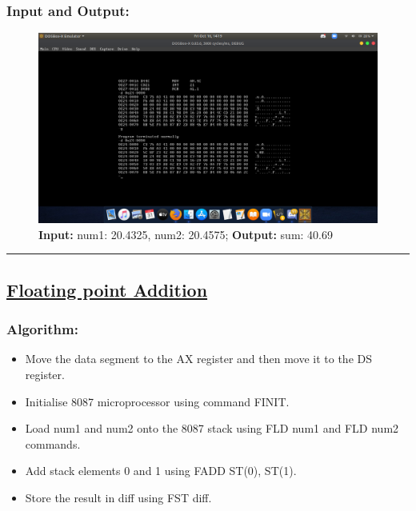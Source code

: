 \documentclass[10pt,a4paper]{article}
\begin{document}
\begin{flushleft}
\subsubsection*{\textbf{Input and Output:}}
\begin{figure}[h]
    \centering
    \includegraphics[trim = 100mm 60mm 100mm 80mm, clip, width = \textwidth]{Pics/FAIO.png}
    \caption{ \textbf{Input:} num1: 20.4325, num2: 20.4575; \newline \hspace{1cm}
              \textbf{Output:} sum: 40.69}
\end{figure}
\hrule
\newpage
\subsection*{\textbf{\underline{Floating point Addition}}}

\subsubsection*{\textbf{Algorithm:}}
\begin{itemize}
    \item Move the data segment to the AX register and then move it to the DS register.
    \item Initialise 8087 microprocessor using command FINIT.
    \item Load num1 and num2 onto the 8087 stack using FLD num1 and FLD num2 commands.
    \item Add stack elements 0 and 1 using FADD ST(0), ST(1).
    \item Store the result in diff using FST diff.
\end{itemize}


\end{flushleft}
\end{document}
